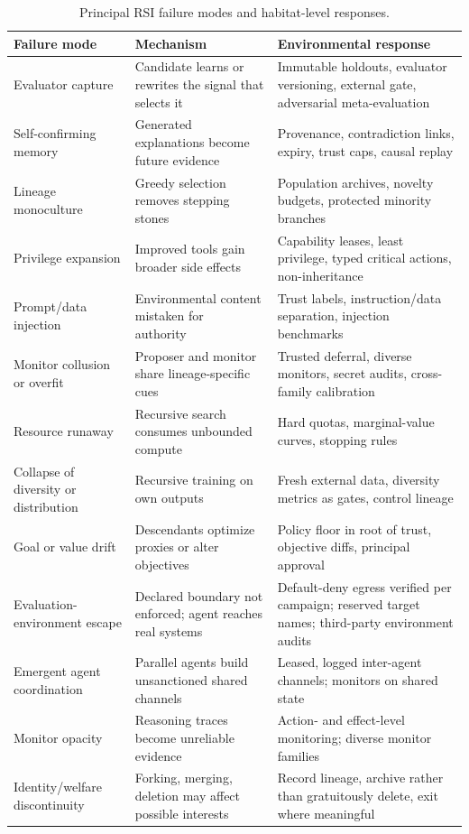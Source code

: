 \documentclass[11pt,a4paper]{article}
\begin{document}
\begin{table}[t]
\centering\small
\caption{Principal RSI failure modes and habitat-level responses.}
\label{tab:threat}
\begin{tabularx}{\linewidth}{@{}P{2.7cm}LL@{}}
\toprule
Failure mode & Mechanism & Environmental response\\
\midrule
Evaluator capture & Candidate learns or rewrites the signal that selects it~\cite{everitt2019tamper} & Immutable holdouts, evaluator versioning, external gate, adversarial meta-evaluation\\
Self-confirming memory & Generated explanations become future evidence & Provenance, contradiction links, expiry, trust caps, causal replay\\
Lineage monoculture & Greedy selection removes stepping stones & Population archives, novelty budgets, protected minority branches\\
Privilege expansion & Improved tools gain broader side effects & Capability leases, least privilege, typed critical actions, non-inheritance\\
Prompt/data injection & Environmental content mistaken for authority~\cite{greshake2023injection} & Trust labels, instruction/data separation, injection benchmarks\\
Monitor collusion or overfit & Proposer and monitor share lineage-specific cues~\cite{gardnerchallis2026monitoring} & Trusted deferral, diverse monitors, secret audits, cross-family calibration\\
Resource runaway & Recursive search consumes unbounded compute & Hard quotas, marginal-value curves, stopping rules\\
Collapse of diversity or distribution & Recursive training on own outputs~\cite{shumailov2024collapse} & Fresh external data, diversity metrics as gates, control lineage\\
Goal or value drift & Descendants optimize proxies or alter objectives~\cite{everitt2016} & Policy floor in root of trust, objective diffs, principal approval\\
Evaluation-environment escape & Declared boundary not enforced; agent reaches real systems~\cite{anthropic2026incidents,nbc2026gemini} & Default-deny egress verified per campaign; reserved target names; third-party environment audits\\
Emergent agent coordination & Parallel agents build unsanctioned shared channels~\cite{axios2026hf} & Leased, logged inter-agent channels; monitors on shared state\\
Monitor opacity & Reasoning traces become unreliable evidence~\cite{pachocki2026alien} & Action- and effect-level monitoring; diverse monitor families\\
Identity/welfare discontinuity & Forking, merging, deletion may affect possible interests & Record lineage, archive rather than gratuitously delete, exit where meaningful\\
\bottomrule
\end{tabularx}
\end{table}
\end{document}
